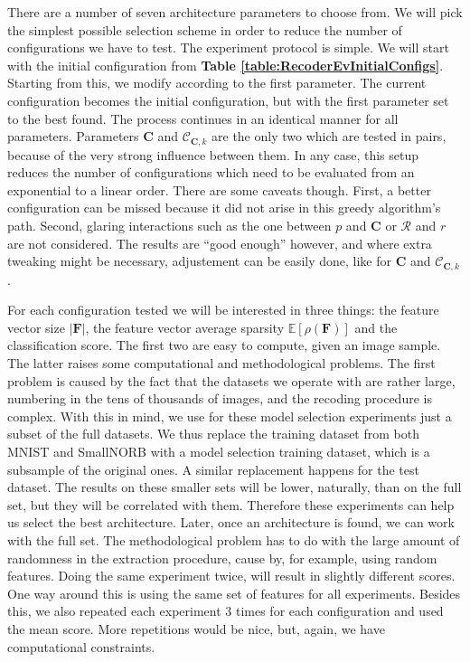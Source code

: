 \documentclass[12pt,a4paper,oneside,english]{UPBThesis}
\begin{document}
There are a number of seven architecture parameters to choose from. We will pick the simplest possible selection scheme in order to reduce the number of configurations we have to test. The experiment protocol is simple. We will start with the initial configuration from \textbf{Table \ref{table:RecoderEvInitialConfigs}}. Starting from this, we modify according to the first parameter. The current configuration becomes the initial configuration, but with the first parameter set to the best found. The process continues in an identical manner for all parameters. Parameters $\textbf{C}$ and $\mathcal{C}_{\textbf{C},k}$ are the only two which are tested in pairs, because of the very strong influence between them. In any case, this setup reduces the number of configurations which need to be evaluated from an exponential to a linear order. There are some caveats though. First, a better configuration can be missed because it did not arise in this greedy algorithm's path. Second, glaring interactions such as the one between $p$ and $\textbf{C}$ or $\mathcal{R}$ and $r$ are not considered. The results are ``good enough'' however, and where extra tweaking might be necessary, adjustement can be easily done, like for $\textbf{C}$ and $\mathcal{C}_{\textbf{C},k}$.

For each configuration tested we will be interested in three things: the feature vector size $\left| \textbf{F} \right|$, the feature vector average sparsity $\mathbb{E}[\rho(\textbf{F})]$ and the classification score. The first two are easy to compute, given an image sample. The latter raises some computational and methodological problems. The first problem is caused by the fact that the datasets we operate with are rather large, numbering in the tens of thousands of images, and the recoding procedure is complex. With this in mind, we use for these model selection experiments just a subset of the full datasets. We thus replace the training dataset from both MNIST and SmallNORB with a model selection training dataset, which is a subsample of the original ones. A similar replacement happens for the test dataset. The results on these smaller sets will be lower, naturally, than on the full set, but they will be correlated with them. Therefore these experiments can help us select the best architecture. Later, once an architecture is found, we can work with the full set. The methodological problem has to do with the large amount of randomness in the extraction procedure, cause by, for example, using random features. Doing the same experiment twice, will result in slightly different scores. One way around this is using the same set of features for all experiments. Besides this, we also repeated each experiment $3$ times for each configuration and used the mean score. More repetitions would be nice, but, again, we have computational constraints.
\end{document}
